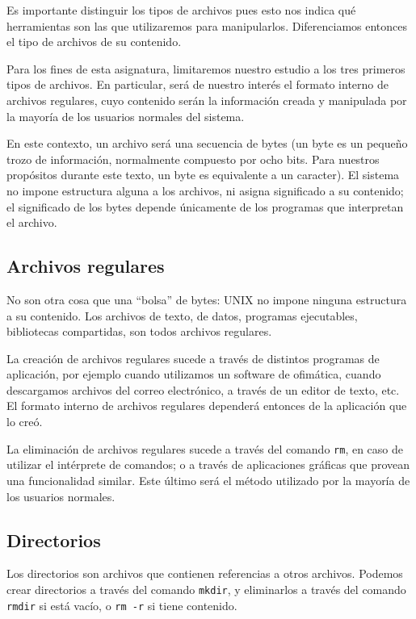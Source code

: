 \documentclass[12pt]{article}
\begin{document}
Es importante distinguir los tipos de archivos pues esto nos indica qué 
herramientas son las que utilizaremos para manipularlos. Diferenciamos 
entonces el tipo de archivos de su contenido.   

Para los fines de esta asignatura, limitaremos nuestro estudio a los tres 
primeros tipos de archivos. En particular, será de nuestro interés el 
formato interno de archivos regulares, cuyo contenido serán la información 
creada y manipulada por la mayoría de los usuarios normales del sistema.  

En este contexto, un archivo será una secuencia de bytes (un byte es un 
pequeño trozo de información, normalmente compuesto por ocho bits. Para 
nuestros propósitos durante este texto, un byte es equivalente a un 
caracter). El sistema no impone estructura alguna a los archivos, ni 
asigna significado a su contenido; el significado de los bytes depende 
únicamente de los programas que interpretan el archivo. 

\subsection*{Archivos regulares}
No son otra cosa que una ``bolsa'' de bytes: UNIX no impone ninguna estructura 
a su contenido. Los archivos de texto, de datos, programas ejecutables, 
bibliotecas compartidas, son todos archivos regulares.

La creación de archivos regulares sucede a través de distintos programas de 
aplicación, por ejemplo cuando utilizamos un software de ofimática, cuando 
descargamos archivos del correo electrónico, a través de un editor de texto, 
etc. El formato interno de archivos regulares dependerá entonces de la 
aplicación que lo creó. 

La eliminación de archivos regulares sucede a través del comando \texttt{rm}, en
caso de utilizar el intérprete de comandos; o a través de aplicaciones 
gráficas que provean una funcionalidad similar. Este último será el método 
utilizado por la mayoría de los usuarios normales. 

\subsection*{Directorios}
Los directorios son archivos que contienen referencias a otros archivos. 
Podemos crear directorios a través del comando \texttt{mkdir}, y eliminarlos
a través del comando \texttt{rmdir} si está vacío, o \texttt{rm -r} si tiene 
contenido. 
\end{document}
